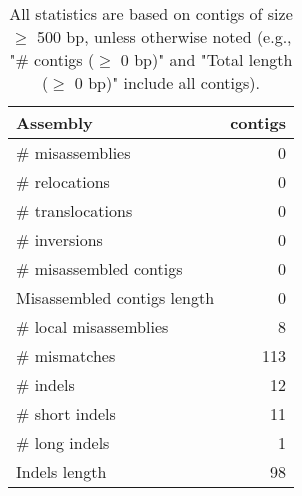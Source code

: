 \documentclass[12pt,a4paper]{article}
\begin{document}
\begin{table}[ht]
\begin{center}
\caption{All statistics are based on contigs of size $\geq$ 500 bp, unless otherwise noted (e.g., "\# contigs ($\geq$ 0 bp)" and "Total length ($\geq$ 0 bp)" include all contigs).}
\begin{tabular}{|l*{1}{|r}|}
\hline
Assembly & contigs \\ \hline
\# misassemblies & 0 \\ \hline
\hspace{5mm}\# relocations & 0 \\ \hline
\hspace{5mm}\# translocations & 0 \\ \hline
\hspace{5mm}\# inversions & 0 \\ \hline
\# misassembled contigs & 0 \\ \hline
Misassembled contigs length & 0 \\ \hline
\# local misassemblies & 8 \\ \hline
\# mismatches & 113 \\ \hline
\# indels & 12 \\ \hline
\hspace{5mm}\# short indels & 11 \\ \hline
\hspace{5mm}\# long indels & 1 \\ \hline
Indels length & 98 \\ \hline
\end{tabular}
\end{center}
\end{table}
\end{document}

